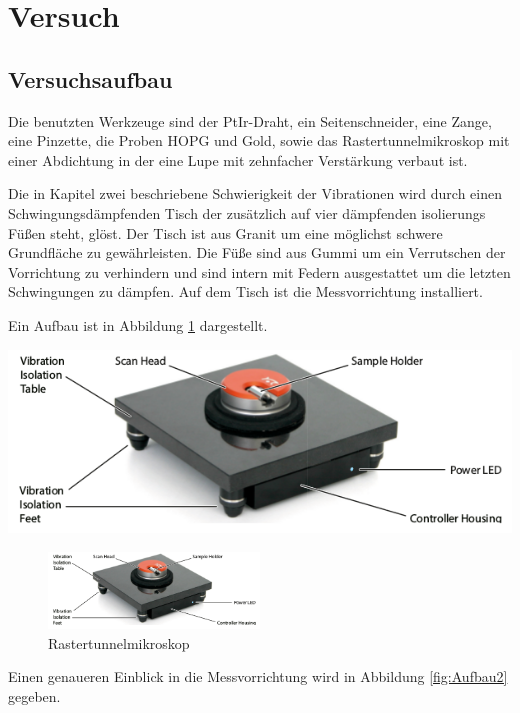 \section{Versuch}
\subsection{Versuchsaufbau}
Die benutzten Werkzeuge sind der PtIr-Draht, ein Seitenschneider, eine Zange, eine Pinzette, die Proben HOPG und Gold, sowie das Rastertunnelmikroskop mit einer Abdichtung in der eine Lupe mit zehnfacher Verstärkung verbaut ist.

\noindent Die in Kapitel zwei beschriebene Schwierigkeit der Vibrationen wird durch einen Schwingungsdämpfenden Tisch der zusätzlich auf vier dämpfenden isolierungs Füßen steht, glöst. Der Tisch ist aus Granit um eine möglichst schwere Grundfläche zu gewährleisten. Die Füße sind aus Gummi um ein Verrutschen der Vorrichtung zu verhindern und sind intern mit Federn ausgestattet um die letzten Schwingungen zu dämpfen. Auf dem Tisch ist die Messvorrichtung installiert.

\noindent Ein Aufbau ist in Abbildung \ref{fig:Aufbau1} dargestellt. 

\includegraphics{Aufbau1.png}
\begin{figure}
	\centering
		\includegraphics[width=0.5\textwidth]{Aufbau1}
	\caption{Rastertunnelmikroskop}
	\label{fig:Aufbau1}
\end{figure}

\noindent Einen genaueren Einblick in die Messvorrichtung wird in Abbildung \ref{fig:Aufbau2} gegeben.

